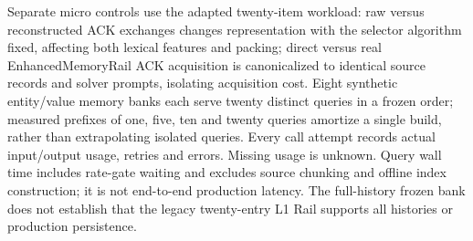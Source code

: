 Separate micro controls use the adapted twenty-item workload: raw versus reconstructed ACK exchanges changes representation with the selector algorithm fixed, affecting both lexical features and packing; direct versus real EnhancedMemoryRail ACK acquisition is canonicalized to identical source records and solver prompts, isolating acquisition cost. Eight synthetic entity/value memory banks each serve twenty distinct queries in a frozen order; measured prefixes of one, five, ten and twenty queries amortize a single build, rather than extrapolating isolated queries. Every call attempt records actual input/output usage, retries and errors. Missing usage is unknown. Query wall time includes rate-gate waiting and excludes source chunking and offline index construction; it is not end-to-end production latency. The full-history frozen bank does not establish that the legacy twenty-entry L1 Rail supports all histories or production persistence.
